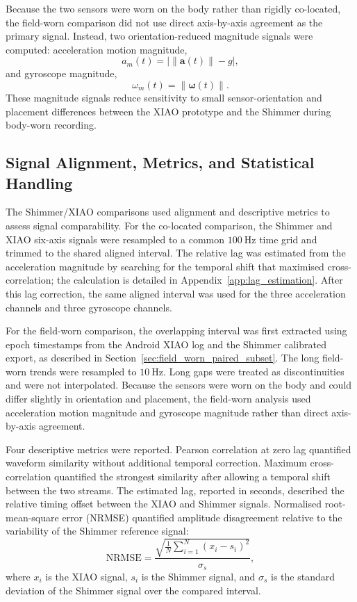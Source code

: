 Because the two sensors were worn on the body rather than rigidly co-located, the field-worn comparison did not use direct axis-by-axis agreement as the primary signal. Instead, two orientation-reduced magnitude signals were computed: acceleration motion magnitude,
\begin{equation}
    a_m(t) = \left|\lVert \mathbf{a}(t) \rVert - g\right|,
\end{equation}
and gyroscope magnitude,
\begin{equation}
    \omega_m(t) = \lVert \boldsymbol{\omega}(t) \rVert .
\end{equation}
These magnitude signals reduce sensitivity to small sensor-orientation and placement differences between the XIAO prototype and the Shimmer during body-worn recording.

\subsection{Signal Alignment, Metrics, and Statistical Handling}\label{sec:signal_alignment_metrics}

The Shimmer/XIAO comparisons used alignment and descriptive metrics to assess signal comparability. For the co-located comparison, the Shimmer and XIAO six-axis signals were resampled to a common \(100~\si{\hertz}\) time grid and trimmed to the shared aligned interval. The relative lag was estimated from the acceleration magnitude by searching for the temporal shift that maximised cross-correlation; the calculation is detailed in Appendix~\ref{app:lag_estimation}. After this lag correction, the same aligned interval was used for the three acceleration channels and three gyroscope channels.

For the field-worn comparison, the overlapping interval was first extracted using epoch timestamps from the Android XIAO log and the Shimmer calibrated export, as described in Section~\ref{sec:field_worn_paired_subset}. The long field-worn trends were resampled to \(10~\si{\hertz}\). Long gaps were treated as discontinuities and were not interpolated. Because the sensors were worn on the body and could differ slightly in orientation and placement, the field-worn analysis used acceleration motion magnitude and gyroscope magnitude rather than direct axis-by-axis agreement.

Four descriptive metrics were reported. Pearson correlation at zero lag quantified waveform similarity without additional temporal correction. Maximum cross-correlation quantified the strongest similarity after allowing a temporal shift between the two streams. The estimated lag, reported in seconds, described the relative timing offset between the XIAO and Shimmer signals. Normalised root-mean-square error (NRMSE) quantified amplitude disagreement relative to the variability of the Shimmer reference signal:
\begin{equation}
    \mathrm{NRMSE} =
    \frac{\sqrt{\frac{1}{N}\sum_{i=1}^{N}(x_i-s_i)^2}}{\sigma_s},
\end{equation}
where \(x_i\) is the XIAO signal, \(s_i\) is the Shimmer signal, and \(\sigma_s\) is the standard deviation of the Shimmer signal over the compared interval.

